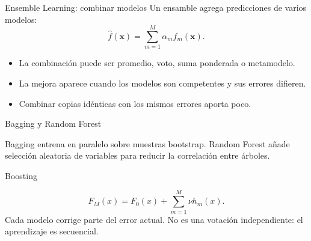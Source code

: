 \documentclass[aspectratio=169,10pt]{beamer}
\begin{document}
\begin{frame}{Ensemble Learning: combinar modelos}
  Un ensamble agrega predicciones de varios modelos:
  \[
    \widehat f(\mathbf{x})=\sum_{m=1}^{M}\alpha_m f_m(\mathbf{x}).
  \]
  \begin{itemize}
    \item La combinación puede ser promedio, voto, suma ponderada o metamodelo.
    \item La mejora aparece cuando los modelos son competentes y sus errores difieren.
    \item Combinar copias idénticas con los mismos errores aporta poco.
  \end{itemize}
\end{frame}

\begin{frame}{Bagging y Random Forest}
  \begin{center}
  \end{center}
  \small Bagging entrena en paralelo sobre muestras bootstrap. Random Forest añade selección aleatoria de variables para reducir la correlación entre árboles.
\end{frame}

\begin{frame}{Boosting}
  \begin{center}
  \end{center}
  \[
    F_M(x)=F_0(x)+\sum_{m=1}^{M}\nu h_m(x).
  \]
  Cada modelo corrige parte del error actual. No es una votación independiente: el aprendizaje es secuencial.
\end{frame}
\end{document}
